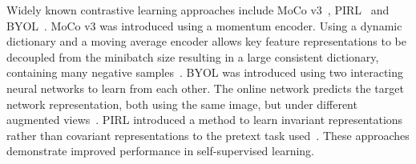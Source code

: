 Widely known contrastive learning approaches include MoCo v3~\cite{he_momentum_2020}, PIRL~\cite{misra_self-supervised_2020} and BYOL~\cite{grill_bootstrap_2020}. MoCo v3 was introduced using a momentum encoder. Using a dynamic dictionary and a moving average encoder allows key feature representations to be decoupled from the minibatch size resulting in a large consistent dictionary, containing many negative samples~\cite{he_momentum_2020}. BYOL was introduced using two interacting neural networks to learn from each other. The online network predicts the target network representation, both using the same image, but under different augmented views~\cite{grill_bootstrap_2020}. PIRL introduced a
method to learn invariant representations rather than covariant representations to the pretext task used~\cite{misra_self-supervised_2020}. These approaches demonstrate improved performance in self-supervised learning. 


